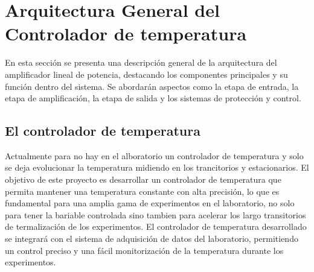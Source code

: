 \chapter[Arquitectura General del Amplificador]{Arquitectura General del Controlador de temperatura}
\label{cp:arquitecturaGeneral}
{
	En esta sección se presenta una descripción general de la arquitectura del amplificador lineal de potencia, destacando los componentes principales y su función dentro del sistema. Se abordarán aspectos como la etapa de entrada, la etapa de amplificación, la etapa de salida y los sistemas de protección y control.

	\section{El controlador de temperatura}
	Actualmente para no hay en el alboratorio un controlador de temperatura y solo se deja evolucionar la temperatura midiendo en los trancitorios y estacionarios. El objetivo de este proyecto es desarrollar un controlador de temperatura que permita mantener una temperatura constante con alta precisión, lo que es fundamental para una amplia gama de experimentos en el laboratorio, no solo para tener la bariable controlada sino tambien para acelerar los largo transitorios de termalización de los experimentos. El controlador de temperatura desarrollado se integrará con el sistema de adquisición de datos del laboratorio, permitiendo un control preciso y una fácil monitorización de la temperatura durante los experimentos.

}
